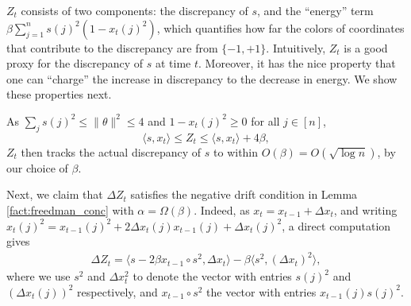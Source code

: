 $Z_t$ consists of two components: the discrepancy of $s$, and the ``energy'' term $\beta \sum_{j=1}^n s(j)^2 (1 - x_t(j)^2)$, which quantifies how far the colors of coordinates that contribute to the discrepancy are from $\{-1,+1\}$.
Intuitively, $Z_t$ is a good proxy for the discrepancy of $s$ at time $t$. Moreover, it has the nice property that one can ``charge'' the increase in discrepancy to the decrease in energy. We show these properties next.

As $\sum_j s(j)^2 \leq \|\theta\|^2 \leq 4$ and $1-x_t(j)^2 \geq 0$ for all $j\in [n]$,  
\[\langle s, x_t \rangle  \leq Z_t \leq \langle s, x_t \rangle + 4 \beta,\]
$Z_t$ then tracks the actual discrepancy of $s$ to within $O(\beta) = O(\sqrt{\log n})$, by our choice of $\beta$. 
\medskip

Next, we claim that $\Delta Z_t$ satisfies the negative drift condition in Lemma \ref{fact:freedman_conc} with $\alpha = \Omega(\beta)$. 
Indeed, as $x_t = x_{t-1} + \Delta x_t$, and writing $x_t(j)^2 =  x_{t-1}(j)^2 + 2 \Delta x_t (j) x_{t-1}(j) + \Delta x_t(j)^2$, a direct computation gives
\begin{align} \label{eq:dZ_t}
\Delta Z_t = \langle s - 2 \beta x_{t-1} \circ s^2, \Delta x_t \rangle  - \beta \langle s^2, (\Delta x_t)^2 \rangle,
\end{align} 
where we use $s^2$ and $\Delta x_t^2$ to denote the vector with entries $s(j)^2$ and  $(\Delta x_t(j))^2$ respectively, and $x_{t-1} \circ s^2$ the vector with entries $x_{t-1}(j) s(j)^2$. 

